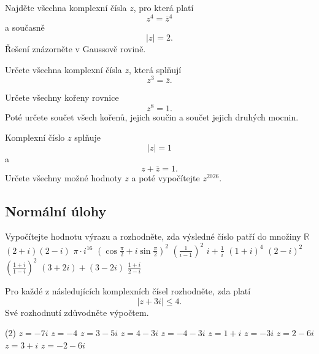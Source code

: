 \begin{exercise}{Najděte všechna komplexní čísla $z$, pro která platí
\[
    z^4=\overline z^4
\]
a současně
\[
    |z|=2.
\]
Řešení znázorněte v Gaussově rovině.}
\end{exercise}


\begin{exercise}{Určete všechna komplexní čísla $z$, která splňují
\[
    z^3=\overline z.
\]
}
\end{exercise}


\begin{exercise}{Určete všechny kořeny rovnice
\[
    z^8=1.
\]
Poté určete součet všech kořenů, jejich součin a součet jejich druhých mocnin.}
\end{exercise}


\begin{exercise}{Komplexní číslo $z$ splňuje
\[
    |z|=1
\]
a
\[
    z+\overline z=1.
\]
Určete všechny možné hodnoty $z$ a poté vypočítejte $z^{2026}$.}
\end{exercise}



\subsection*{Normální úlohy}



\begin{exerciseblock}[2]{Vypočítejte hodnotu výrazu a rozhodněte, zda výsledné číslo patří do množiny $\mathbb{R}$}
    \task $(2+i)(2-i)$
    \task $\pi\cdot i^{16}$
    \task $\displaystyle \left(\cos\frac{\pi}{2}+i\sin\frac{\pi}{2}\right)^2$
    \task $\displaystyle \left(\frac{1}{i-1}\right)^2$
    \task $\displaystyle i+\frac{1}{i}$
    \task $(1+i)^4$
    \task $(2-i)^2$
    \task $\displaystyle \left(\frac{1+i}{1-i}\right)^2$
    \task $(3+2i)+(3-2i)$
    \task $\displaystyle \frac{1+i}{2-i}$
\end{exerciseblock}



\begin{exercise}{Pro každé z následujících komplexních čísel rozhodněte, zda platí
\[
    |z+3i|\leq4.
\]
Své rozhodnutí zdůvodněte výpočtem.}

    \begin{tasks}(2)
        \task $z=-7i$
        \task $z=-4$
        \task $z=3-5i$
        \task $z=4-3i$
        \task $z=-4-3i$
        \task $z=1+i$
        \task $z=-3i$
        \task $z=2-6i$
        \task $z=3+i$
        \task $z=-2-6i$
    \end{tasks}
\end{exercise}


